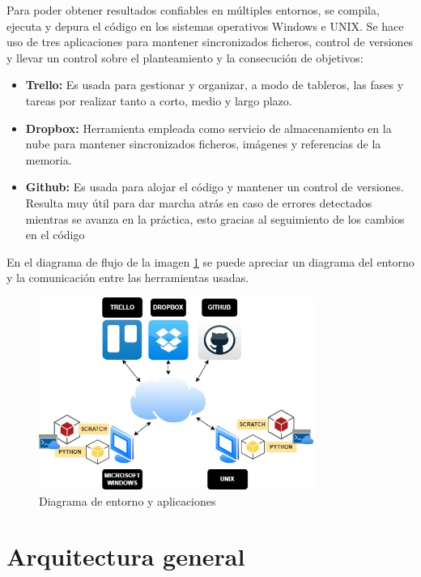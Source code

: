 \documentclass[a4paper, 12pt]{book}
\begin{document}
Para poder obtener resultados confiables en múltiples entornos, se compila, ejecuta y depura el código en los sistemas operativos Windows e UNIX. Se hace uso de tres aplicaciones para mantener sincronizados ficheros, control de versiones y llevar un control sobre el planteamiento y la consecución de objetivos:

\begin{itemize}
  \item \textbf{Trello:} Es usada para gestionar y organizar, a modo de tableros, las fases y tareas por realizar tanto a corto, medio y largo plazo. 
  \item \textbf{Dropbox:} Herramienta empleada como servicio de almacenamiento en la nube para mantener sincronizados ficheros, imágenes y referencias de la memoria.
  \item \textbf{Github:} Es usada para alojar el código y mantener un control de versiones. Resulta muy útil para dar marcha atrás en caso de errores detectados mientras se avanza en la práctica, esto gracias al seguimiento de los cambios en el código
\end{itemize}

En el diagrama de flujo de la imagen \ref{fig:diagrama_trabajo} se puede apreciar un diagrama del entorno y la comunicación entre las herramientas usadas.

 \begin{figure}[!h]
    \centering
    \includegraphics[width=9cm, keepaspectratio]{img/workplace.jpg}
    \caption{Diagrama de entorno y aplicaciones}
    \label{fig:diagrama_trabajo}
 \end{figure}

\section{Arquitectura general} 
\label{sec:arquitectura}

\end{document}
